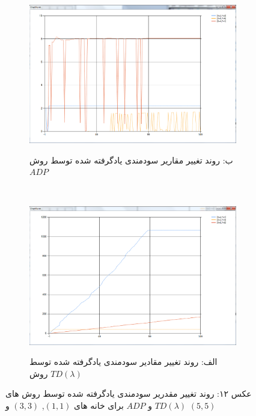 \documentclass[10pt,a4paper]{article}
\begin{document}
\begin{figure}[h]
        \centering
        \begin{subfigure}[b]{0.5\textwidth}
            \includegraphics[width=\textwidth]{r-adp}
            \begin{center}
                \textarabic{ب: روند تغییر مقاریر سودمندی یادگرفته شده توسط روش $ADP$ }
            \end{center}
        \end{subfigure}%
        ~ %
        \begin{subfigure}[b]{0.5\textwidth}
           \includegraphics[width=\textwidth]{r-td}
            \begin{center}
                \textarabic{الف: روند تغییر مقادیر سودمندی یادگرفته شده توسط روش $TD(\lambda)$ }
            \end{center}
        \end{subfigure}
    \begin{center}
    \textarabic{عکس ۱۲: روند تغییر مقدریر سودمندی یادگرفته شده توسط روش های
     $TD(\lambda)$ و $ADP$
      برای خانه های 
          $(1, 1)$, $(3,3)$ 
     و
      $(5, 5)$
     }
    \end{center}
\end{figure}
\end{document}
